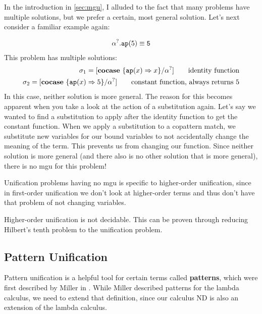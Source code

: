 \documentclass[twoside,12pt,a4paper]{article}
\begin{document}
In the introduction in \cref{sec:mgu}, I alluded to the fact that many problems have multiple solutions, but we prefer a certain, most general solution.
Let's next consider a familiar example again:
\begin{example}
    \begin{align*}
        \alpha^?.\texttt{ap}(5) \equiv \texttt{5}
    \end{align*}
    This problem has multiple solutions:
    \begin{align*}
        \sigma_1 = [\textbf{cocase}\ \{\texttt{ap}(x)\Rightarrow x\} / \alpha^?]\tag*{identity function}\\
        \sigma_2 = [\textbf{cocase}\ \{\texttt{ap}(x)\Rightarrow 5\} / \alpha^?]\tag*{constant function, always returns 5}
    \end{align*}
    In this case, neither solution is more general. The reason for this becomes apparent when you take a look at the action of a substitution again. 
Let's say we wanted to find a substitution to apply after the identity function to get the constant function. 
When we apply a substitution to a copattern match, we substitute new variables for our bound variables to not accidentally change the meaning of the term.
This prevents us from changing our function. 
Since neither solution is more general (and there also is no other solution that is more general),
there is no mgu for this problem!
\end{example}

Unification problems having no mgu is specific to higher-order unification, since in first-order unification we don't look at 
higher-order terms and thus don't have that problem of not changing variables.

\begin{theorem}
    Higher-order unification is not decidable. This can be proven through reducing Hilbert's tenth problem to the unification problem. \cite{DBLP:books/el/RV01/Dowek01}
\end{theorem}

\subsection{Pattern Unification}

Pattern unification is a helpful tool for certain terms called \textbf{patterns}, which were first described by Miller in \cite{10.1093/logcom/1.4.497}.
While Miller described patterns for the lambda calculus, we need to extend that definition, since our calculus ND is also an extension of the lambda calculus. 
\end{document}
